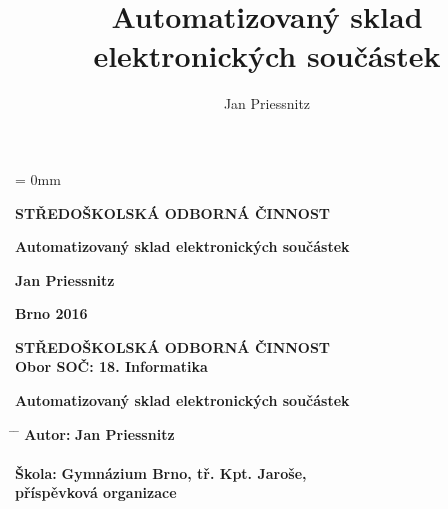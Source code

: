 \documentclass[12pt, a4paper, oneside]{article}
\author{Jan Priessnitz}
\title{Automatizovaný sklad elektronických součástek}
\begin{document}
\hoffset = 0mm

\pagestyle{empty} %

\enlargethispage{60mm} %

\begin{center}

\Large \textbf{STŘEDOŠKOLSKÁ ODBORNÁ ČINNOST}

\vspace{60mm}

\huge %
\textbf{Automatizovaný sklad elektronických součástek}

\Large

\vspace{90mm}


\textbf{Jan Priessnitz} \\

\vspace{40mm}

\textbf{Brno 2016}


\end{center}

\newpage %

\enlargethispage{60mm} %

\begin{center}

\Large \textbf{STŘEDOŠKOLSKÁ ODBORNÁ ČINNOST}  \\
\vspace{10mm}
 \normalsize
\textbf{Obor SOČ:  18. Informatika}

\vspace{45mm}

\LARGE %
\textbf{Automatizovaný sklad elektronických součástek}
\end{center}
\large

\vspace{50mm}


\begin{tabbing}
\hspace{10mm} \= \hspace{30mm}  \=   \kill %
  \> \textbf{Autor:}  \> \textbf{Jan Priessnitz}        \\
  \>              \>                               \\[8mm]
  \> \textbf{Škola:}   \> \textbf{Gymnázium Brno, tř. Kpt. Jaroše,}     \\
  \>              \> \textbf{příspěvková organizace}    \\[8mm]

\end{tabbing}
\end{document}
